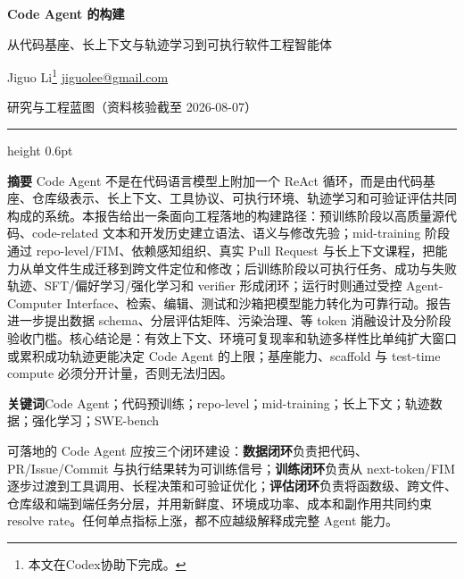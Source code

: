 \documentclass[10pt,a4paper,UTF8,fontset=none]{ctexart}
\begin{document}
\markboth{}{}

\begin{center}
  {\bfseries\color{Navy} Code Agent 的构建\par}
  \vspace{4pt}
  {\color{Navy} 从代码基座、长上下文与轨迹学习到可执行软件工程智能体\par}
  \vspace{6pt}
  {\small Jiguo Li\footnote{{本文在Codex协助下完成。}}\quad
  \href{mailto:jiguolee@gmail.com}{jiguolee@gmail.com}\par}
  \vspace{4pt}
  {\small 研究与工程蓝图（资料核验截至 2026-08-07）\par}
\end{center}

\vspace{6pt}
{\color{Navy}\hrule height 0.6pt}
\vspace{8pt}

\noindent\textbf{摘要}\quad
Code Agent 不是在代码语言模型上附加一个 ReAct 循环，而是由代码基座、仓库级表示、长上下文、工具协议、可执行环境、轨迹学习和可验证评估共同构成的系统。本报告给出一条面向工程落地的构建路径：预训练阶段以高质量源代码、code-related 文本和开发历史建立语法、语义与修改先验；mid-training 阶段通过 repo-level/FIM、依赖感知组织、真实 Pull Request 与长上下文课程，把能力从单文件生成迁移到跨文件定位和修改；后训练阶段以可执行任务、成功与失败轨迹、SFT/偏好学习/强化学习和 verifier 形成闭环；运行时则通过受控 Agent-Computer Interface、检索、编辑、测试和沙箱把模型能力转化为可靠行动。报告进一步提出数据 schema、分层评估矩阵、污染治理、等 token 消融设计及分阶段验收门槛。核心结论是：有效上下文、环境可复现率和轨迹多样性比单纯扩大窗口或累积成功轨迹更能决定 Code Agent 的上限；基座能力、scaffold 与 test-time compute 必须分开计量，否则无法归因。

\vspace{5pt}
\noindent\textbf{关键词}\quad Code Agent；代码预训练；repo-level；mid-training；长上下文；轨迹数据；强化学习；SWE-bench

\begin{keybox}[阅读摘要]
可落地的 Code Agent 应按三个闭环建设：\textbf{数据闭环}负责把代码、PR/Issue/Commit 与执行结果转为可训练信号；\textbf{训练闭环}负责从 next-token/FIM 逐步过渡到工具调用、长程决策和可验证优化；\textbf{评估闭环}负责将函数级、跨文件、仓库级和端到端任务分层，并用新鲜度、环境成功率、成本和副作用共同约束 resolve rate。任何单点指标上涨，都不应越级解释成完整 Agent 能力。
\end{keybox}
\end{document}
